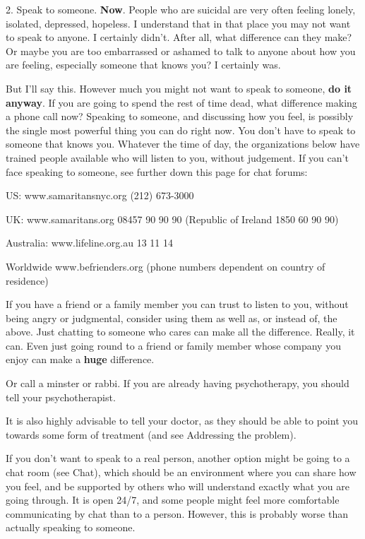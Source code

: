 \documentclass[12pt]{article}
\begin{document}
2. Speak to someone. \textbf{Now}. People who are suicidal are very often feeling lonely, isolated, depressed, hopeless. I understand that in that place you may not want to speak to anyone. I certainly didn't. After all, what difference can they make? Or maybe you are too embarrassed or ashamed to talk to anyone about how you are feeling, especially someone that knows you? I certainly was.

But I'll say this. However much you might not want to speak to someone, \textbf{do it anyway}. If you are going to spend the rest of time dead, what difference making a phone call now? Speaking to someone, and discussing how you feel, is possibly the single most powerful thing you can do right now. You don't have to speak to someone that knows you. Whatever the time of day, the organizations below have trained people available who will listen to you, without judgement. If you can't face speaking to someone, see further down this page for chat forums:

US: www.samaritansnyc.org (212) 673-3000

UK: www.samaritans.org 08457 90 90 90 (Republic of Ireland 1850 60 90 90)

Australia: www.lifeline.org.au 13 11 14

Worldwide www.befrienders.org (phone numbers dependent on country of residence)

If you have a friend or a family member you can trust to listen to you, without being angry or judgmental, consider using them as well as, or instead of, the above. Just chatting to someone who cares can make all the difference. Really, it can. Even just going round to a friend or family member whose company you enjoy can make a \textbf{huge} difference.

Or call a minster or rabbi. If you are already having psychotherapy, you should tell your psychotherapist.

It is also highly advisable to tell your doctor, as they should be able to point you towards some form of treatment (and see Addressing the problem).

If you don't want to speak to a real person, another option might be going to a chat room (see Chat), which should be an environment where you can share how you feel, and be supported by others who will understand exactly what you are going through. It is open 24/7, and some people might feel more comfortable communicating by chat than to a person. However, this is probably worse than actually speaking to someone.
\end{document}
